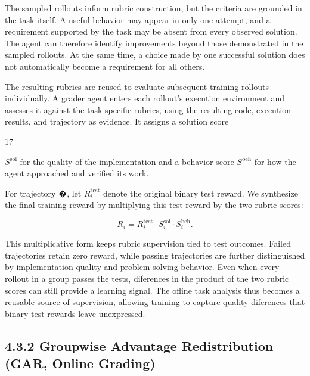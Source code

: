 \documentclass[
  10
]{article}
\begin{document}
The sampled rollouts inform rubric construction, but the criteria are
grounded in the task itself. A useful behavior may appear in only one
attempt, and a requirement supported by the task may be absent from
every observed solution. The agent can therefore identify improvements
beyond those demonstrated in the sampled rollouts. At the same time, a
choice made by one successful solution does not automatically become a
requirement for all others.

The resulting rubrics are reused to evaluate subsequent training
rollouts individually. A grader agent enters each rollout's execution
environment and assesses it against the task-specific rubrics, using the
resulting code, execution results, and trajectory as evidence. It
assigns a solution score

17

\(S ^ { \mathrm { s o l } }\) for the quality of the implementation and
a behavior score \(S ^ { \mathrm { b e h } }\) for how the agent
approached and verified its work.

For trajectory �, let \(R _ { i } ^ { \mathrm { t e s t } }\) denote the
original binary test reward. We synthesize the final training reward by
multiplying this test reward by the two rubric scores:

\[
R _ { i } = R _ { i } ^ { \mathrm { t e s t } } \cdot S _ { i } ^ { \mathrm { s o l } } \cdot S _ { i } ^ { \mathrm { b e h } } .\tag{2}
\]

This multiplicative form keeps rubric supervision tied to test outcomes.
Failed trajectories retain zero reward, while passing trajectories are
further distinguished by implementation quality and problem-solving
behavior. Even when every rollout in a group passes the tests,
diferences in the product of the two rubric scores can still provide a
learning signal. The ofline task analysis thus becomes a reusable source
of supervision, allowing training to capture quality diferences that
binary test rewards leave unexpressed.

\subsection{4.3.2 Groupwise Advantage Redistribution (GAR, Online
Grading)}\label{groupwise-advantage-redistribution-gar-online-grading}
\end{document}
